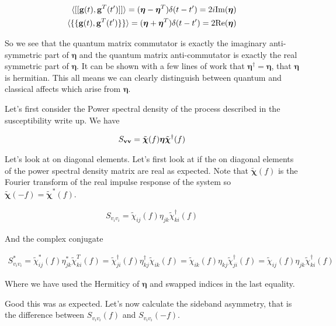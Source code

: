 \documentclass[12pt]{article}
\newcommand{\bv}[1]{\bold{#1}}
\newcommand{\bvs}[1]{\boldsymbol{#1}}
\begin{document}
\begin{align}
\braket{[[\bv{g}(t),\bv{g}^T(t')]]} = (\boldsymbol{\eta} - \boldsymbol{\eta}^T)\delta(t-t') = 2i\text{Im}(\boldsymbol{\eta})\\
\braket{\{\{\bv{g}(t),\bv{g}^T(t')\}\}} = (\boldsymbol{\eta} + \boldsymbol{\eta}^T)\delta(t-t') = 2\text{Re}(\boldsymbol{\eta})\\
\end{align}

So we see that the quantum matrix commutator is exactly the imaginary anti-symmetric part of $\bvs{\eta}$ and the quantum matrix anti-commutator is exactly the real symmetric part of $\bvs{\eta}$. It can be shown with a few lines of work that $\boldsymbol{\eta}^{\dagger} = \boldsymbol{\eta}$, that $\boldsymbol{\eta}$ is hermitian. This all means we can clearly distinguish between quantum and classical affects which arise from $\bvs{\eta}$.

Let's first consider the Power spectral density of the process described in the susceptibility write up. We have

\begin{align}
S_{\bv{v}\bv{v}} = \tilde{\bvs{\chi}}(f) \bvs{\eta} \tilde{\bvs{\chi}}^{\dag}(f)
\end{align}

Let's look at on diagonal elements. Let's first look at if the on diagonal elements of the power spectral density matrix are real as expected. Note that $\tilde{\bvs{\chi}}(f)$ is the Fourier transform of the real impulse response of the system so $\tilde{\bvs{\chi}}(-f) = \tilde{\bvs{\chi}}^*(f)$.

\begin{align}
S_{v_i v_i} = \tilde{\chi}_{ij}(f) \eta_{jk} \tilde{\chi}^{\dag}_{ki}(f)
\end{align}

And the complex conjugate

\begin{align}
S_{v_i v_i}^* = \tilde{\chi}^*_{ij}(f) \eta^*_{jk} \tilde{\chi}^T_{ki}(f) = \tilde{\chi}^{\dag}_{ji}(f) \eta^{\dag}_{kj} \tilde{\chi}_{ik}(f) = \tilde{\chi}_{ik}(f)\eta_{kj} \tilde{\chi}^{\dag}_{ji}(f) = \tilde{\chi}_{ij}(f) \eta_{jk} \tilde{\chi}^{\dag}_{ki}(f)
\end{align}

Where we have used the Hermiticy of $\bvs{\eta}$ and swapped indices in the last equality.

Good this was as expected. Let's now calculate the sideband asymmetry, that is the difference between $S_{v_i v_i}(f)$ and $S_{v_i v_i}(-f)$.
\end{document}
